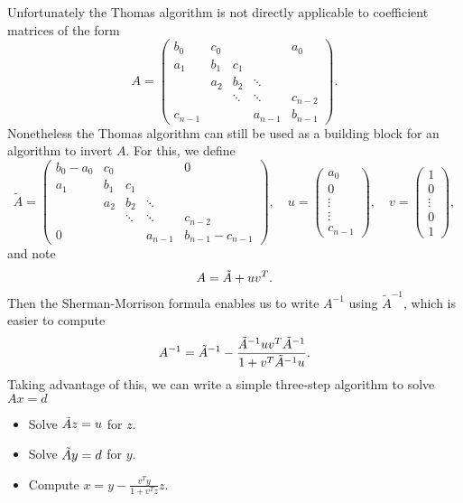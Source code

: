 \documentclass[10pt,a4paper]{article}
\begin{document}
Unfortunately the Thomas algorithm is not directly applicable 
to coefficient matrices of the form
%
\begin{equation}\label{E:def-periodic-tridiag-A}
A = 
{\scriptscriptstyle
  \left(\begin{array}{ccccc}
     b_0   & c_0 &        &         & a_0     \\
     a_1   & b_1 &  c_1   &         &         \\
           & a_2 &  b_2   & \ddots  &         \\
           &     & \ddots & \ddots  & c_{n-2} \\
    c_{n-1}&     &        & a_{n-1} & b_{n-1}
  \end{array}\right).
}
\end{equation}
%
Nonetheless the Thomas algorithm can still be used as 
a building block for an algorithm to invert $A$.
For this, we define
%
\[
\tilde{A} = 
{\scriptscriptstyle
  \left(\begin{array}{ccccc}
  b_0-a_0& c_0 &        &         &   0     \\
     a_1 & b_1 &  c_1   &         &         \\
         & a_2 &  b_2   & \ddots  &         \\
         &     & \ddots & \ddots  & c_{n-2} \\
      0  &     &        & a_{n-1} & b_{n-1}-c_{n-1}
  \end{array}\right),
}
\quad
u = 
{\scriptscriptstyle
  \left(\begin{array}{c}
     a_0 \\ 0 \\ \vdots \\ \vdots \\ c_{n-1}
  \end{array}\right),
}
\quad
v = 
{\scriptscriptstyle
  \left(\begin{array}{c}
     1 \\ 0 \\ \vdots \\ 0 \\ 1
  \end{array}\right),
}
\]
%
and note 
\[
A = \Tilde{A} + u v^T.
\]
Then the Sherman-Morrison formula enables us to write $A^{-1}$
using $\tilde{A}^{-1}$, which is easier to compute
\[
A^{-1} = \Tilde{A}^{-1} - \frac{\Tilde{A}^{-1} u v^T \Tilde{A}^{-1}}{1 + v^T \Tilde{A}^{-1} u}.
\]
Taking advantage of this, we can write a simple three-step algorithm 
to solve $A x = d$
%
\begin{itemize}
\item Solve $\Tilde{A} z = u$ for $z$.
\item Solve $\Tilde{A} y = d$ for $y$.
\item Compute $x = y - \frac{v^T y}{1 + v^T z} z$.
\end{itemize}
%
\end{document}
